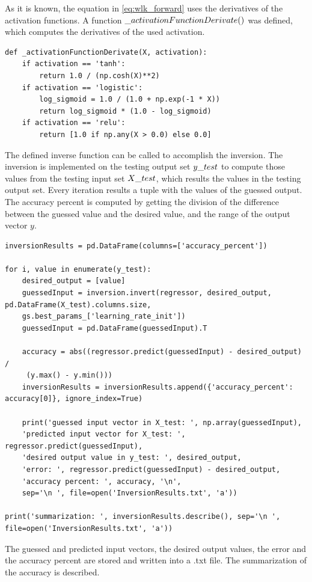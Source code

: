 As it is known, the equation in \eqref{eq:wlk_forward} uses the derivatives of the activation functions. A function $\char`_activationFunctionDerivate()$ was defined, which computes the derivatives of the used activation.
\begin{lstlisting}
def _activationFunctionDerivate(X, activation):
	if activation == 'tanh':
		return 1.0 / (np.cosh(X)**2)
	if activation == 'logistic':
		log_sigmoid = 1.0 / (1.0 + np.exp(-1 * X))
		return log_sigmoid * (1.0 - log_sigmoid)
	if activation == 'relu':
		return [1.0 if np.any(X > 0.0) else 0.0]
\end{lstlisting}

\medskip The defined inverse function can be called to accomplish the inversion. The inversion is implemented on the testing output set $y\char`_test$ to compute those values from the testing input set $X\char`_test$, which results the values in the testing output set. Every iteration results a tuple with the values of the guessed output.\\
The accuracy percent is computed by getting the division of the difference between the guessed value and the desired value, and the range of the output vector $y$. 
\begin{lstlisting}
inversionResults = pd.DataFrame(columns=['accuracy_percent'])

for i, value in enumerate(y_test):
	desired_output = [value]
	guessedInput = inversion.invert(regressor, desired_output, pd.DataFrame(X_test).columns.size,
	gs.best_params_['learning_rate_init'])
	guessedInput = pd.DataFrame(guessedInput).T

	accuracy = abs((regressor.predict(guessedInput) - desired_output) /
	 (y.max() - y.min()))
	inversionResults = inversionResults.append({'accuracy_percent': accuracy[0]}, ignore_index=True)

	print('guessed input vector in X_test: ', np.array(guessedInput),
	'predicted input vector for X_test: ', regressor.predict(guessedInput),
	'desired output value in y_test: ', desired_output,
	'error: ', regressor.predict(guessedInput) - desired_output,
	'accuracy percent: ', accuracy, '\n',
	sep='\n ', file=open('InversionResults.txt', 'a'))

print('summarization: ', inversionResults.describe(), sep='\n ', file=open('InversionResults.txt', 'a'))
\end{lstlisting}
The guessed and predicted input vectors, the desired output values, the error and the accuracy percent are stored and written into a .txt file. The summarization of the accuracy is described.


